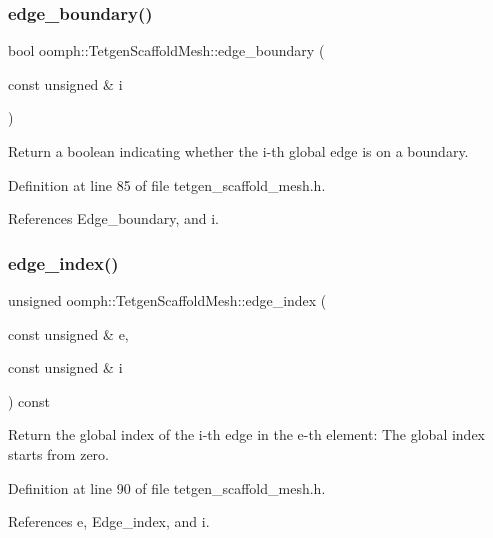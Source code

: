 \subsubsection{\texorpdfstring{edge\+\_\+boundary()}{edge\_boundary()}}
{\footnotesize\ttfamily bool oomph\+::\+Tetgen\+Scaffold\+Mesh\+::edge\+\_\+boundary (\begin{DoxyParamCaption}\item[{const unsigned \&}]{i }\end{DoxyParamCaption})\hspace{0.3cm}{\ttfamily [inline]}}



Return a boolean indicating whether the i-\/th global edge is on a boundary. 



Definition at line 85 of file tetgen\+\_\+scaffold\+\_\+mesh.\+h.



References Edge\+\_\+boundary, and i.

\mbox{\label{classoomph_1_1TetgenScaffoldMesh_a9fa4f9f34c9f455b6f79a44411278a1f}} 
\subsubsection{\texorpdfstring{edge\+\_\+index()}{edge\_index()}}
{\footnotesize\ttfamily unsigned oomph\+::\+Tetgen\+Scaffold\+Mesh\+::edge\+\_\+index (\begin{DoxyParamCaption}\item[{const unsigned \&}]{e,  }\item[{const unsigned \&}]{i }\end{DoxyParamCaption}) const\hspace{0.3cm}{\ttfamily [inline]}}



Return the global index of the i-\/th edge in the e-\/th element\+: The global index starts from zero. 



Definition at line 90 of file tetgen\+\_\+scaffold\+\_\+mesh.\+h.



References e, Edge\+\_\+index, and i.

